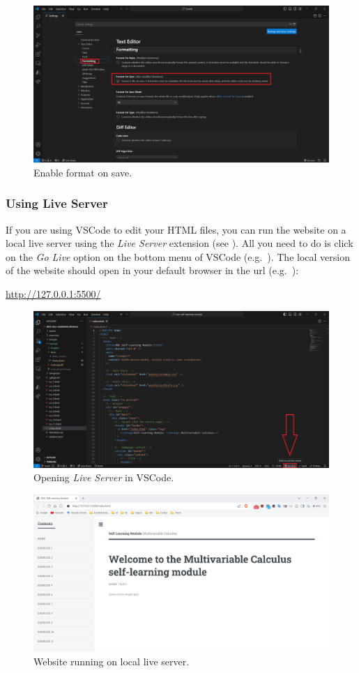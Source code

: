 \documentclass[a4paper,10pt]{article}
\begin{document}
\begin{figure}[htbp]
    \centering
    \includegraphics[width=\textwidth]{format_on_save.png}
    \caption{Enable format on save.}
    \label{fig:format_on_save}   
\end{figure}


\subsubsection{Using Live Server}

If you are using VSCode to edit your HTML files, you can run the website on a local live server using the \emph{Live Server} extension (see ). All you need to do is click on the \emph{Go Live} option on the bottom menu of VSCode (e.g.\ ). The local version of the website should open in your default browser in the url (e.g.\ ):

\url{http://127.0.0.1:5500/}

\begin{figure}[htbp]
    \centering
    \includegraphics[width=\textwidth]{run_live_server.png}
    \caption{Opening \emph{Live Server} in VSCode.}
    \label{fig:run_live_server}   
\end{figure}

\begin{figure}[htbp]
    \centering
    \includegraphics[width=\textwidth]{website_live_server.png}
    \caption{Website running on local live server.}
    \label{fig:website_live_server}   
\end{figure}
\end{document}
